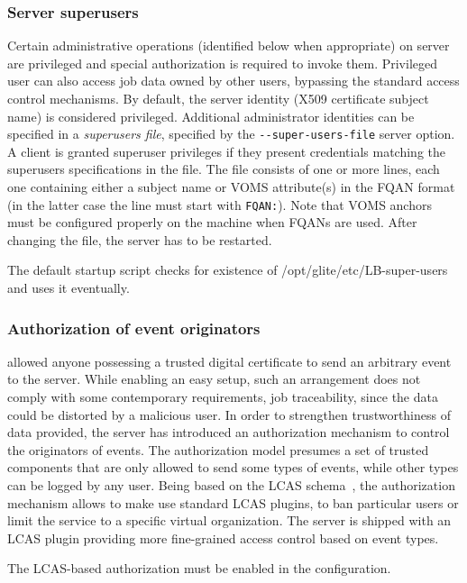 \subsubsection{Server superusers}
\label{inst:superusers}

Certain administrative operations (identified below when appropriate) on \LB
server are privileged and special authorization is required to invoke them.
Privileged user can also access job data owned by other users, bypassing the
standard \LB access control mechanisms.  By default, the \LB server identity
(X509 certificate subject name) is considered privileged.  Additional
administrator identities can be specified in a \emph{superusers file},
specified by the \verb'--super-users-file' server option.  A client is granted
superuser privileges if they present credentials matching the superusers
specifications in the file.  The file consists of one or more lines, each one
containing either a subject name or VOMS attribute(s) in the FQAN format (in
the latter case the line must start with \verb'FQAN:').  Note that VOMS anchors
must be configured properly on the \LB machine when FQANs are used.  After
changing the file, the server has to be restarted. 

The default startup script checks for existence of 
/opt/glite/etc/LB-super-users and uses it eventually.

\subsubsection{Authorization of event originators}
 allowed anyone possessing a trusted digital certificate to send an
arbitrary event to the \LB server. While enabling an easy setup, such an
arrangement does not comply with some contemporary requirements, \eg job
traceability, since the data could be distorted by a malicious user.  In order
to strengthen trustworthiness of data provided, the  server has
introduced an authorization mechanism to control the originators of events.
The authorization model presumes a set of trusted components that are only
allowed to send some types of events, while other types can be logged by any
user. Being based on the LCAS schema~\cite{lcas}, the authorization mechanism
allows to make use standard LCAS plugins, \eg to ban particular users or limit
the service to a specific virtual organization. The \LB server is shipped with
an LCAS plugin providing more fine-grained access control based on event types.

The LCAS-based authorization must be enabled in the \LB configuration.


